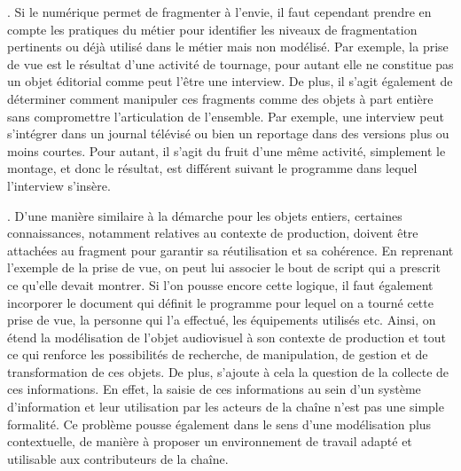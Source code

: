 \begin{liste}
	\item {}.
	Si le numérique permet de fragmenter à l'envie, il faut cependant prendre en compte les pratiques du métier pour identifier les niveaux de fragmentation pertinents ou déjà utilisé dans le métier mais non modélisé.
	Par exemple, la prise de vue est le résultat d'une activité de tournage, pour autant elle ne constitue pas un objet éditorial comme peut l'être une interview.
	De plus, il s'agit également de déterminer comment manipuler ces fragments comme des objets à part entière sans compromettre l'articulation de l'ensemble. 
	Par exemple, une interview peut s'intégrer dans un journal télévisé ou bien un reportage dans des versions plus ou moins courtes. 
	Pour autant, il s'agit du fruit d'une même activité, simplement le montage, et donc le résultat, est différent suivant le programme dans lequel l'interview s'insère.\\
	
	\item {}.
	D'une manière similaire à la démarche pour les objets entiers, certaines connaissances, notamment relatives au contexte de production, doivent être attachées au fragment pour garantir sa réutilisation et sa cohérence. 
	En reprenant l'exemple de la prise de vue, on peut lui associer le bout de script qui a prescrit ce qu'elle devait montrer. 
	Si l'on pousse encore cette logique, il faut également incorporer le document qui définit le programme pour lequel on a tourné cette prise de vue, la personne qui l'a effectué, les équipements utilisés etc. 
	Ainsi, on étend la modélisation de l'objet audiovisuel à son contexte de production et tout ce qui renforce les possibilités de recherche, de manipulation, de gestion et de transformation de ces objets. 
	De plus, s'ajoute à cela la question de la collecte de ces informations. 
	En effet, la saisie de ces informations au sein d'un système d'information et leur utilisation par les acteurs de la chaîne n'est pas une simple formalité.
	Ce problème pousse également dans le sens d'une modélisation plus contextuelle, de manière à proposer un environnement de travail adapté et utilisable aux contributeurs de la chaîne.\\
	

\end{liste}
